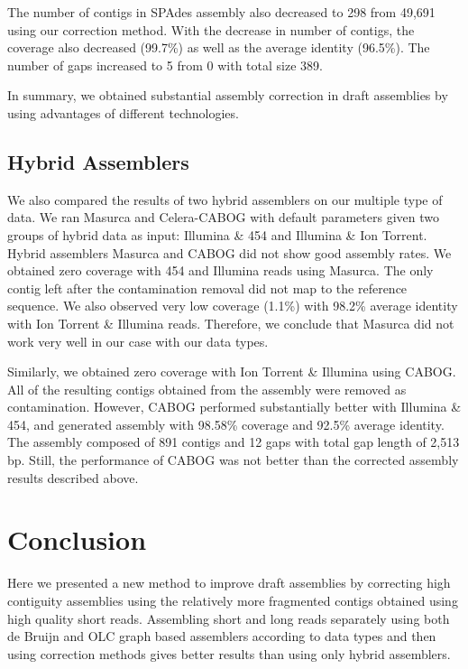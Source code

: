 \documentclass{llncs}
\begin{document}
The number of contigs in SPAdes assembly also decreased to 298 from 49,691 using our correction method. With the decrease in number of contigs, the coverage also decreased (99.7\%) as well as the average identity (96.5\%). The number of gaps increased to 5 from 0 with total size 389.

In summary, we obtained substantial assembly correction
 in draft assemblies by using advantages of different technologies.

\subsection{Hybrid Assemblers}

We also compared the results of two hybrid assemblers on our multiple type of data. We ran Masurca and Celera-CABOG with default parameters given two groups of hybrid data as input: Illumina \& 454 and Illumina \& Ion Torrent. Hybrid assemblers Masurca and CABOG did not show good assembly rates.
We obtained zero coverage with 454 and Illumina reads using Masurca. The only contig left after the contamination removal did not map to the reference sequence. We also observed very low coverage (1.1\%) with 98.2\% average identity  with Ion Torrent \& Illumina reads. Therefore, we conclude that Masurca did not work very well in our case with our data types. 

Similarly, we obtained zero coverage with Ion Torrent \& Illumina using CABOG. All of the resulting contigs obtained from the assembly were removed as contamination. However, CABOG performed substantially better with
Illumina \& 454, and generated assembly with 98.58\% coverage and 92.5\% average identity.
The assembly composed of 891 contigs and 12 gaps with total gap length of 2,513 bp. Still, 
the performance of CABOG was not better than the corrected assembly results described above.

\section{Conclusion}

Here we presented a new method to improve draft assemblies by correcting high contiguity assemblies using the relatively more fragmented contigs obtained using high quality short reads. Assembling short and long reads separately using both de Bruijn and OLC graph based assemblers according to data types and then using correction methods  gives better results than using only hybrid assemblers.
\end{document}
